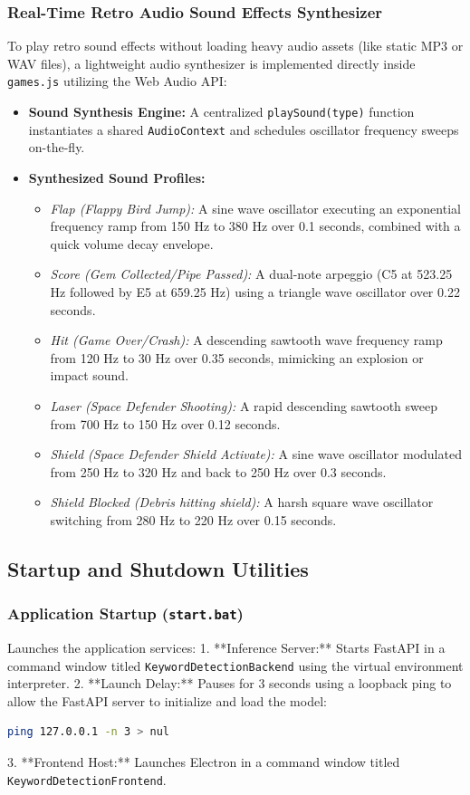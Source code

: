 \subsubsection{Real-Time Retro Audio Sound Effects Synthesizer}
To play retro sound effects without loading heavy audio assets (like static MP3 or WAV files), a lightweight audio synthesizer is implemented directly inside \texttt{games.js} utilizing the Web Audio API:
\begin{itemize}
    \item \textbf{Sound Synthesis Engine:} A centralized \texttt{playSound(type)} function instantiates a shared \texttt{AudioContext} and schedules oscillator frequency sweeps on-the-fly.
    \item \textbf{Synthesized Sound Profiles:}
    \begin{itemize}
        \item \textit{Flap (Flappy Bird Jump):} A sine wave oscillator executing an exponential frequency ramp from 150 Hz to 380 Hz over 0.1 seconds, combined with a quick volume decay envelope.
        \item \textit{Score (Gem Collected/Pipe Passed):} A dual-note arpeggio (C5 at 523.25 Hz followed by E5 at 659.25 Hz) using a triangle wave oscillator over 0.22 seconds.
        \item \textit{Hit (Game Over/Crash):} A descending sawtooth wave frequency ramp from 120 Hz to 30 Hz over 0.35 seconds, mimicking an explosion or impact sound.
        \item \textit{Laser (Space Defender Shooting):} A rapid descending sawtooth sweep from 700 Hz to 150 Hz over 0.12 seconds.
        \item \textit{Shield (Space Defender Shield Activate):} A sine wave oscillator modulated from 250 Hz to 320 Hz and back to 250 Hz over 0.3 seconds.
        \item \textit{Shield Blocked (Debris hitting shield):} A harsh square wave oscillator switching from 280 Hz to 220 Hz over 0.15 seconds.
    \end{itemize}
\end{itemize}


\subsection{Startup and Shutdown Utilities}

\subsubsection{Application Startup (\texttt{start.bat})}
Launches the application services:
1. **Inference Server:** Starts FastAPI in a command window titled \texttt{KeywordDetectionBackend} using the virtual environment interpreter.
2. **Launch Delay:** Pauses for 3 seconds using a loopback ping to allow the FastAPI server to initialize and load the model:
   \begin{lstlisting}[language=bash]
   ping 127.0.0.1 -n 3 > nul
   \end{lstlisting}
3. **Frontend Host:** Launches Electron in a command window titled \texttt{KeywordDetectionFrontend}.

